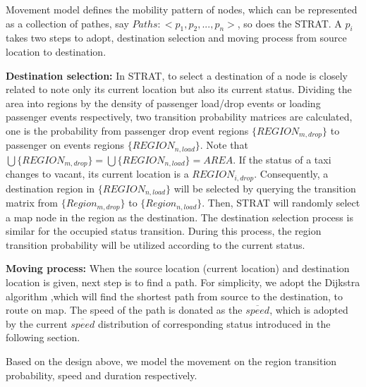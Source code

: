 
Movement model defines the mobility pattern of nodes, which can be represented as a collection of pathes, say $Paths:<p_1,p_2,...,p_n>$, so does the STRAT. A $p_i$ takes two steps to adopt, destination selection and moving process from source location to destination.

\textbf{Destination selection:} In STRAT, to select a destination of a node is closely related to note only its current location but also its current status. Dividing the area into regions by the density of passenger load/drop events or loading passenger events respectively, two transition probability matrices are calculated, one is the probability from passenger drop event regions $\{REGION_{m,drop}\}$ to passenger on events regions $\{REGION_{n,load}\}$. Note that $\bigcup\{REGION_{m,drop}\}=\bigcup\{REGION_{n,load}\}=AREA$. If the status of a taxi changes to vacant, its current location is a $REGION_{i,drop}$. Consequently, a destination region in $\{REGION_{n,load}\}$ will be selected by querying the transition matrix from $\{Region_{m,drop}\}$ to $\{Region_{n,load}\}$. Then, STRAT will randomly select a map node in the region as the destination. The destination selection process is similar for the occupied status transition. During this process, the region transition probability will be utilized according to the current status.

\textbf{Moving process:} When the source location (current location) and destination location is given, next step is to find a path. For simplicity, we adopt the Dijkstra algorithm ,which will find the shortest path from source to the destination, to route on map. The speed of the path is donated as the $\overline{speed}$, which is adopted by the current $\overline{speed}$  distribution of corresponding status introduced in the following section.

Based on the design above, we model the movement on the region transition probability, speed and duration respectively.



